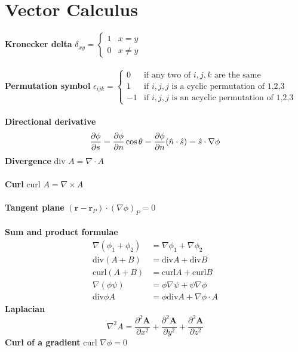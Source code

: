 \documentclass{article}
\begin{document}
\section{Vector Calculus}
\textbf{Kronecker delta}
$  \delta_{xy} = \begin{cases} 1 & x = y \\ 0 & x \ne y \end{cases}$
\\
\\
\textbf{Permutation symbol} $  \epsilon_{ijk} = \begin{cases} 0 & \mbox{if any two of } i, j, k \mbox{ are the same} \\ 1 & \mbox{if } i, j, j \mbox{ is a cyclic permutation of 1,2,3}  \\ -1 & \mbox{if } i, j, j \mbox{ is an acyclic permutation of 1,2,3} \end{cases}$
\\
\\
\textbf{Directional derivative}
$$ \frac{\partial \phi}{\partial s} = \frac{\partial \phi}{\partial n} \cos \theta = \frac{\partial \phi}{\partial n} (\Hat{n} \cdot \Hat{s}) = \Hat{s} \cdot \nabla \phi$$
\textbf{Divergence} $ \mbox{div } A = \nabla \cdot A$
\\
\\
\textbf{Curl} $ \mbox{curl } A = \nabla \times A$
\\
\\
\textbf{Tangent plane }$(\boldsymbol{r} - \boldsymbol{r}_P)\cdot(\nabla \phi)_P = 0$
\\
\\
\textbf{Sum and product formulae}
\begin{align*}
    \nabla (\phi_1 + \phi_2) &= \nabla \phi_1 + \nabla \phi_2 \\
    \mbox{div} (A + B) &= \mbox{div} A + \mbox{div} B
    \\
    \mbox{curl} (A+B) &= \mbox{curl} A + \mbox{curl} B
    \\
    \nabla (\phi \psi) &= \phi \nabla \psi + \psi \nabla \phi
    \\
    \mbox{div} \phi A &= \phi \mbox{div} A + \nabla \phi \cdot A
\end{align*}
\textbf{Laplacian}
$$\nabla^2 A = \frac{\partial^2 \boldsymbol{A}}{\partial x^2} + \frac{\partial^2 \boldsymbol{A}}{\partial y^2} + \frac{\partial^2 \boldsymbol{A}}{\partial z^2}$$
\textbf{Curl of a gradient } $\mbox{curl } \nabla \phi = 0$
\\
\\
\end{document}
